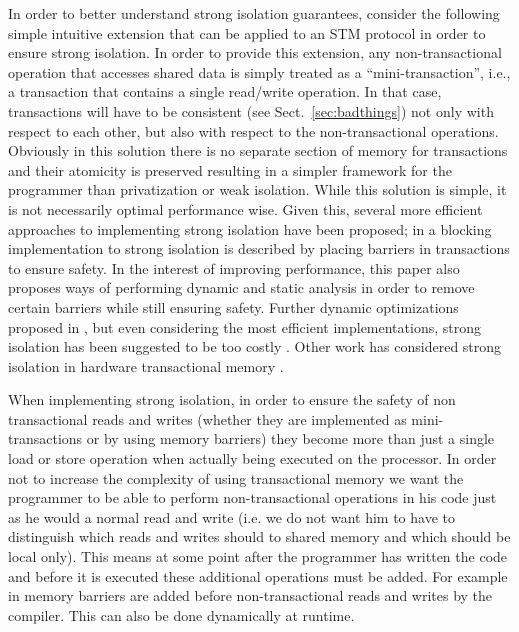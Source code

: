 In order to better understand strong isolation guarantees, consider
the following simple intuitive extension that can be applied to an STM protocol
in order to ensure strong isolation.
In order to provide this extension, any non-transactional operation that 
accesses shared data is simply treated as a ``mini-transaction'', i.e., a transaction  that contains a
single read/write operation. In that case,  transactions  will have to  be  
consistent (see Sect.~\ref{sec:badthings})  not only with 
respect to each other, but 
also with respect to the  non-transactional operations.
Obviously in this solution there is no separate section of memory for transactions
and their atomicity is preserved resulting in a simpler framework for
the programmer than privatization or weak isolation.
While this solution is simple, it is not necessarily optimal performance wise.
Given this, several more efficient approaches to implementing strong isolation have been proposed;
in \cite{shpeis07} a blocking implementation to strong isolation
is described by placing barriers in transactions to ensure safety.
In the interest of improving performance, this paper also proposes ways of performing dynamic
and static analysis in order to remove certain barriers
while still ensuring safety.
Further dynamic optimizations proposed in \cite{SMSA08}, but
even considering the most efficient implementations, strong isolation has been suggested to be too costly \cite{DS09}.
Other work has considered strong isolation in hardware transactional memory \cite{MTCM07}.

When implementing strong isolation, in order to ensure the safety of non transactional reads and writes
(whether they are implemented as mini-transactions or by using memory barriers)
they become more than just a single load or store operation when actually being executed on the processor.
In order not to increase the complexity of using transactional memory we want the programmer to be
able to perform non-transactional operations in his code just as he would a normal read and write
(i.e. we do not want him to have to distinguish which reads and writes should to shared memory and which
should be local only).
This means at some point after the programmer has written the code and before it is executed
these additional operations must be added.
For example in \cite{shpeis07,SMSA08} memory barriers are added before non-transactional reads and writes
by the compiler.
This can also be done dynamically at runtime.



